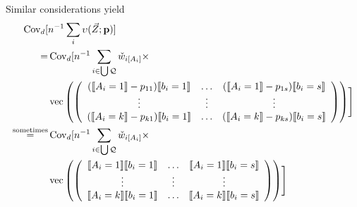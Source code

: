\documentclass{article}
\DeclarePairedDelimiter{\indicator}{\llbracket}{\rrbracket}
\newcommand{\owt}[1][{[a_i]}]{\ensuremath{\check{w}_{i#1}}}
\newcommand{\absorbInterceptsEF}{\upsilon}
\begin{document}
Similar considerations yield
\begin{align}
\operatorname{Cov}_{d}[
  &n^{-1}\sum_{i}\absorbInterceptsEF(\vec{Z}; \mathbf{p})] \nonumber\\
  =&\operatorname{Cov}_{d}[n^{-1}
                                                 \sum_{i \in \bigcup
     \mathcal{Q}} \owt[{[A_{i}]}] \times \nonumber \\
&  \operatorname{vec}\left(%
                                                 \left(
                                                 \begin{array}{ccc}
                                                   (\indicator{A_{i}=1}-p_{11})\indicator{b_{i}=1}&\ldots&(\indicator{A_{i}=1}-p_{1s})\indicator{b_{i}=s}\\
                                                   \vdots & \vdots &
                                                                     \vdots
                                                   \\
                                                   (\indicator{A_{i}=k}-p_{k1})\indicator{b_{i}=1}&\ldots&(\indicator{A_{i}=k}-p_{ks})\indicator{b_{i}=s}\\                                                   
                                                 \end{array}
  \right)%
  \right)
  \Biggr] \nonumber \\ 
  \stackrel{\text{sometimes}}{=}&\operatorname{Cov}_{d}[n^{-1}
                                                 \sum_{i \in \bigcup
     \mathcal{Q}} \owt[{[A_{i}]}] \times \nonumber \\
  &\operatorname{vec}\left(%
                                                 \left(
                                                 \begin{array}{ccc}
                                                   \indicator{A_{i}=1}\indicator{b_{i}=1}&\ldots&\indicator{A_{i}=1}\indicator{b_{i}=s}\\
                                                   \vdots & \vdots &
                                                                     \vdots
                                                   \\
                                                   \indicator{A_{i}=k}\indicator{b_{i}=1}&\ldots&\indicator{A_{i}=k}\indicator{b_{i}=s}\\                                                   
                                                 \end{array}  
  \right)%
  \right)
    \Biggr] \label{eq:11}
\end{align}
\end{document}
